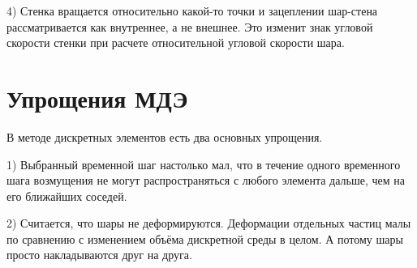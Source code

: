 \documentclass[a4paper]{article}
\begin{document}
4) Стенка вращается относительно какой-то точки и зацеплении шар-стена рассматривается как внутреннее, а не внешнее. 
Это изменит знак угловой скорости стенки при расчете относительной угловой скорости шара.


\section{Упрощения МДЭ}

В методе дискретных элементов есть два основных упрощения.

1) Выбранный временной шаг настолько мал, что в течение одного временного шага возмущения не могут распространяться с любого элемента дальше, чем на его ближайших соседей. 

2) Считается, что шары не деформируются.
Деформации отдельных частиц малы по сравнению с изменением объёма дискретной среды в целом.
А потому шары просто накладываются друг на друга.
\end{document}
